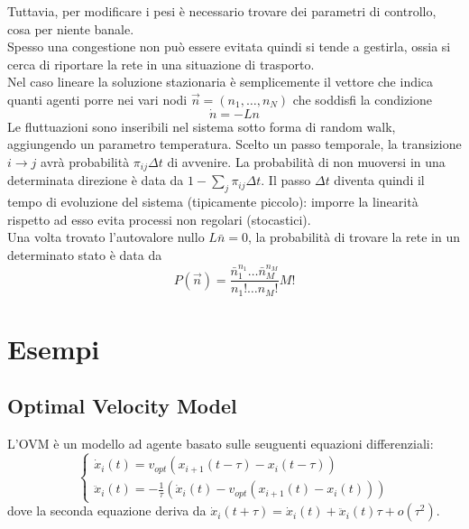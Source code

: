 \documentclass[12pt, a4paper]{book}
\theoremstyle{theorem}
\newtheorem{theorem}{Teorema}[section]
\begin{document}
				Tuttavia, per modificare i pesi è necessario trovare dei parametri di controllo, cosa per niente banale.\\
				Spesso una congestione non può essere evitata quindi si tende a gestirla, ossia si cerca di riportare la rete in una situazione di trasporto.\\
				Nel caso lineare la soluzione stazionaria è semplicemente il vettore che indica quanti agenti porre nei vari nodi $\vec{n}=(n_1,\ldots,n_N)$ che soddisfi la condizione
				\begin{equation*}
					\dot{n}=-Ln
				\end{equation*}
				Le fluttuazioni sono inseribili nel sistema sotto forma di random walk, aggiungendo un parametro temperatura.
				Scelto un passo temporale, la transizione $i\to j$ avrà probabilità $\pi_{ij}\Delta t$ di avvenire.
				La probabilità di non muoversi in una determinata direzione è data da $1-\sum_j\pi_{ij}\Delta t$.
				Il passo $\Delta t$ diventa quindi il tempo di evoluzione del sistema (tipicamente piccolo): imporre la linearità rispetto ad esso evita processi non regolari (stocastici).\\
				Una volta trovato l'autovalore nullo $L\bar{n}=0$, la probabilità di trovare la rete in un determinato stato è data da
				\begin{equation}
					P(\vec{n})=\frac{\bar{n}_1^{n_1}\ldots\bar{n}_M^{n_M}}{n_1!\ldots n_M!}M!
				\end{equation}

		\section{Esempi}
			\subsection{Optimal Velocity Model}
				L'OVM è un modello ad agente basato sulle seuguenti equazioni differenziali:
				\begin{equation}
					\begin{cases}
						\dot{x}_i(t)=v_{opt}\left(x_{i+1}(t-\tau)-x_i(t-\tau)\right)\\
						\ddot{x}_i(t)=-\frac{1}{\tau}\left(\dot{x}_i(t)-v_{opt}(x_{i+1}(t)-x_i(t))\right)
					\end{cases}
				\end{equation}
				dove la seconda equazione deriva da $\dot{x}_i(t+\tau)=\dot{x}_i(t)+\ddot{x}_i(t)\tau+o(\tau^2)$.

		
\end{document}
